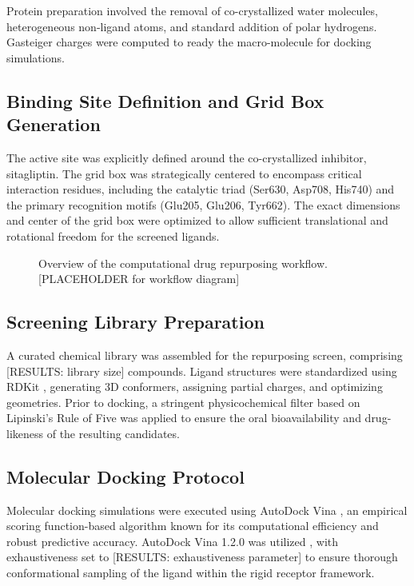 \documentclass[12pt]{article}
\begin{document}
Protein preparation involved the removal of co-crystallized water molecules, heterogeneous non-ligand atoms, and standard addition of polar hydrogens. Gasteiger charges were computed to ready the macro-molecule for docking simulations. 

\subsection{Binding Site Definition and Grid Box Generation}
The active site was explicitly defined around the co-crystallized inhibitor, sitagliptin. The grid box was strategically centered to encompass critical interaction residues, including the catalytic triad (Ser630, Asp708, His740) and the primary recognition motifs (Glu205, Glu206, Tyr662). The exact dimensions and center of the grid box were optimized to allow sufficient translational and rotational freedom for the screened ligands.

\begin{figure}[H]
    \centering
    \caption{Overview of the computational drug repurposing workflow. [PLACEHOLDER for workflow diagram]}
    \label{fig:workflow}
\end{figure}

\subsection{Screening Library Preparation}
A curated chemical library was assembled for the repurposing screen, comprising [RESULTS: library size] compounds. Ligand structures were standardized using RDKit \citep{Landrum_RDKit}, generating 3D conformers, assigning partial charges, and optimizing geometries. Prior to docking, a stringent physicochemical filter based on Lipinski’s Rule of Five \citep{Lipinski2001} was applied to ensure the oral bioavailability and drug-likeness of the resulting candidates.

\subsection{Molecular Docking Protocol}
Molecular docking simulations were executed using AutoDock Vina \citep{Trott2010}, an empirical scoring function-based algorithm known for its computational efficiency and robust predictive accuracy. AutoDock Vina 1.2.0 was utilized \citep{Eberhardt2021}, with exhaustiveness set to [RESULTS: exhaustiveness parameter] to ensure thorough conformational sampling of the ligand within the rigid receptor framework.
\end{document}
